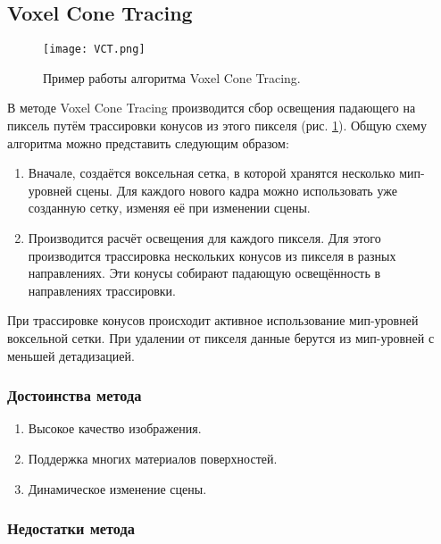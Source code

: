 \documentclass[12pt,fleqn]{article}
\begin{document}
\subsection{Voxel Cone Tracing}

\begin{figure}[htb]
    \centering
    \texttt{[image: VCT.png]}
    \caption{Пример работы алгоритма Voxel Cone Tracing.}
    \label{vct}
\end{figure}

В методе Voxel Cone Tracing \cite{VoxelConeTracing} производится сбор освещения падающего на пиксель путём трассировки конусов из этого пикселя (рис. \ref{vct}). Общую схему алгоритма можно представить следующим образом:

\begin{enumerate}

\item Вначале, создаётся воксельная сетка, в которой хранятся несколько мип-уровней сцены. Для каждого нового кадра можно использовать уже созданную сетку, изменяя её при изменении сцены.

\item Производится расчёт освещения для каждого пикселя. Для этого производится трассировка нескольких конусов из пикселя в разных направлениях. Эти конусы собирают падающую освещённость в направлениях трассировки.

\end{enumerate}

При трассировке конусов происходит активное использование мип-уровней воксельной сетки. При удалении от пикселя данные берутся из мип-уровней с меньшей детадизацией.

\subsubsection{Достоинства метода}

\begin{enumerate}

\item Высокое качество изображения.

\item Поддержка многих материалов поверхностей.

\item Динамическое изменение сцены.

\end{enumerate}

\subsubsection{Недостатки метода}
\end{document}
